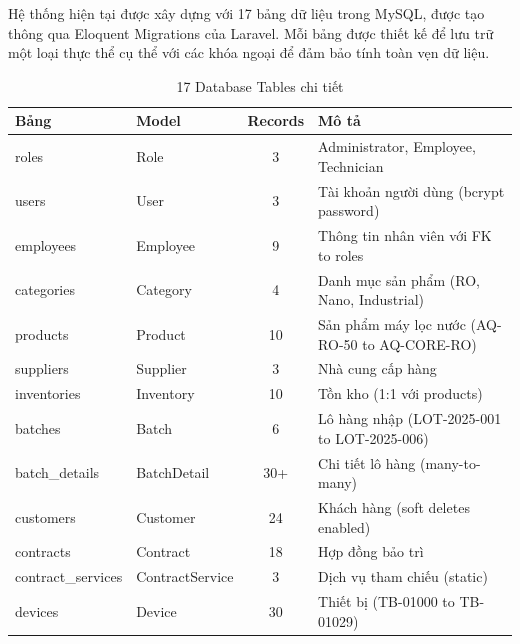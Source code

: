 Hệ thống hiện tại được xây dựng với 17 bảng dữ liệu trong MySQL, được tạo thông qua Eloquent Migrations của Laravel. Mỗi bảng được thiết kế để lưu trữ một loại thực thể cụ thể với các khóa ngoại để đảm bảo tính toàn vẹn dữ liệu.

\begin{table}[H]
\centering
\caption{17 Database Tables chi tiết}
\label{tab:database_tables}
\small
\begin{tabularx}{\textwidth}{|l|l|c|X|}
\hline
\textbf{Bảng} & \textbf{Model} & \textbf{Records} & \textbf{Mô tả} \\
\hline

roles & Role & 3 & Administrator, Employee, Technician \\
\hline

users & User & 3 & Tài khoản người dùng (bcrypt password) \\
\hline

employees & Employee & 9 & Thông tin nhân viên với FK to roles \\
\hline

categories & Category & 4 & Danh mục sản phẩm (RO, Nano, Industrial) \\
\hline

products & Product & 10 & Sản phẩm máy lọc nước (AQ-RO-50 to AQ-CORE-RO) \\
\hline

suppliers & Supplier & 3 & Nhà cung cấp hàng \\
\hline

inventories & Inventory & 10 & Tồn kho (1:1 với products) \\
\hline

batches & Batch & 6 & Lô hàng nhập (LOT-2025-001 to LOT-2025-006) \\
\hline

batch\_details & BatchDetail & 30+ & Chi tiết lô hàng (many-to-many) \\
\hline

customers & Customer & 24 & Khách hàng (soft deletes enabled) \\
\hline

contracts & Contract & 18 & Hợp đồng bảo trì \\
\hline

contract\_services & ContractService & 3 & Dịch vụ tham chiếu (static) \\
\hline

devices & Device & 30 & Thiết bị (TB-01000 to TB-01029) \\
\hline


\end{tabularx}
\end{table}
